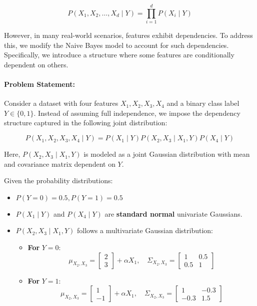 \documentclass[12pt,letterpaper, onecolumn]{exam}
\begin{document}
\begin{questions}
\[
P(X_1, X_2, \dots, X_d \mid Y) = \prod_{i=1}^{d} P(X_i \mid Y)
\]

However, in many real-world scenarios, features exhibit dependencies. To address this, we modify the Naive Bayes model to account for such dependencies. Specifically, we introduce a structure where some features are conditionally dependent on others.

\paragraph*{Problem Statement:}
Consider a dataset with four features \( X_1, X_2, X_3, X_4 \) and a binary class label \( Y \in \{0,1\} \). Instead of assuming full independence, we impose the dependency structure captured in the following joint distribution:

\[
P(X_1, X_2, X_3, X_4 \mid Y) = P(X_1 \mid Y) P(X_2, X_3 \mid X_1, Y) P(X_4 \mid Y)
\]

Here, \( P(X_2, X_3 \mid X_1, Y) \) is modeled as a joint Gaussian distribution with mean and covariance matrix dependent on \( Y \).

Given the probability distributions:
\begin{itemize}
    \item $P(Y=0) = 0.5, P(Y=1) = 0.5$
    \item \( P(X_1 \mid Y) \) and \( P(X_4 \mid Y) \) are \textbf{standard normal} univariate Gaussians.
    \item \( P(X_2, X_3 \mid X_1, Y) \) follows a multivariate Gaussian distribution:
    \begin{itemize}
        \item \textbf{For} \( Y = 0 \):
        \[
        \mu_{X_2, X_3} = \begin{bmatrix} 2 \\ 3 \end{bmatrix} + \alpha X_1, \quad \Sigma_{X_2, X_3} = \begin{bmatrix} 1 & 0.5 \\ 0.5 & 1 \end{bmatrix}
        \]
        \item \textbf{For} \( Y = 1 \):
        \[
        \mu_{X_2, X_3} = \begin{bmatrix} 1 \\ -1 \end{bmatrix} + \alpha X_1, \quad \Sigma_{X_2, X_3} = \begin{bmatrix} 1 & -0.3 \\ -0.3 & 1.5 \end{bmatrix}
        \]
    \end{itemize}
\end{itemize}


\end{questions}
\end{document}
